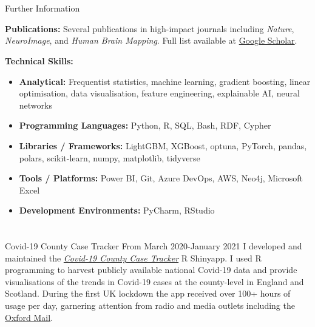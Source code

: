 \documentclass{my_cv}
\begin{document}
\section{\faPencil}{Further Information}
{\begin{addmargin}[2em]{1em}
\textbf{Publications:} Several publications in high-impact journals including \textit{Nature}, \textit{NeuroImage}, and \textit{Human Brain Mapping}. Full list available at \href{https://scholar.google.com/citations?user=h4aoOucAAAAJ}{Google Scholar}.

\hspace{-1.5em}\textbf{Technical Skills:} 
\begin{itemize}[topsep=0pt,itemsep=0pt,partopsep=0pt, parsep=0pt]
    \item \textbf{Analytical:} Frequentist statistics, machine learning, gradient boosting, linear optimisation, data visualisation, feature engineering, explainable AI, neural networks
    \item \textbf{Programming Languages:} Python, R, SQL, Bash, RDF, Cypher
    \item \textbf{Libraries / Frameworks:} LightGBM, XGBoost, optuna, PyTorch, pandas, polars, scikit-learn, numpy, matplotlib, tidyverse
    \item \textbf{Tools / Platforms:} Power BI, Git, Azure DevOps, AWS, Neo4j, Microsoft Excel
    \item \textbf{Development Environments:} PyCharm, RStudio
\end{itemize}
\end{addmargin}}
    
\section{\faLaptop}{Covid-19 County Case Tracker}
From March 2020-January 2021 I developed and maintained the \href{https://covid19cct.shinyapps.io/covid19cct/}{\textit{Covid-19 County Case Tracker}} R Shinyapp. I used R programming to harvest publicly available national Covid-19 data and provide visualisations of the trends in Covid-19 cases at the county-level in England and Scotland. During the first UK lockdown the app received over 100+ hours of usage per day, garnering attention from radio and media outlets including the \href{https://www.oxfordmail.co.uk/news/18358052.app-tracks-oxfordshire-covid-19-cases/}{Oxford Mail}.
\end{document}
